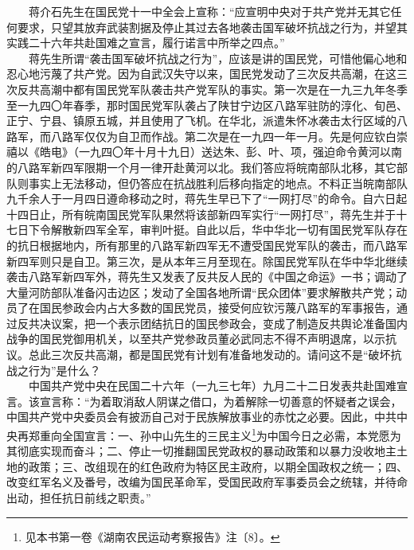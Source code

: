 \documentclass[cn,11pt,chinese]{elegantbook}
\begin{document}
　　蒋介石先生在国民党十一中全会上宣称：“应宣明中央对于共产党并无其它任何要求，只望其放弃武装割据及停止其过去各地袭击国军破坏抗战之行为，并望其实践二十六年共赴国难之宣言，履行诺言中所举之四点。”\\
　　蒋先生所谓“袭击国军破坏抗战之行为”，应该是讲的国民党，可惜他偏心地和忍心地污蔑了共产党。因为自武汉失守以来，国民党发动了三次反共高潮，在这三次反共高潮中都有国民党军队袭击共产党军队的事实。第一次是在一九三九年冬季至一九四〇年春季，那时国民党军队袭占了陕甘宁边区八路军驻防的淳化、旬邑、正宁、宁县、镇原五城，并且使用了飞机。在华北，派遣朱怀冰袭击太行区域的八路军，而八路军仅仅为自卫而作战。第二次是在一九四一年一月。先是何应钦白崇禧以《皓电》（一九四〇年十月十九日）送达朱、彭、叶、项，强迫命令黄河以南的八路军新四军限期一个月一律开赴黄河以北。我们答应将皖南部队北移，其它部队则事实上无法移动，但仍答应在抗战胜利后移向指定的地点。不料正当皖南部队九千余人于一月四日遵命移动之时，蒋先生早已下了“一网打尽”的命令。自六日起十四日止，所有皖南国民党军队果然将该部新四军实行“一网打尽”，蒋先生并于十七日下令解散新四军全军，审判叶挺。自此以后，华中华北一切有国民党军队存在的抗日根据地内，所有那里的八路军新四军无不遭受国民党军队的袭击，而八路军新四军则只是自卫。第三次，是从本年三月至现在。除国民党军队在华中华北继续袭击八路军新四军外，蒋先生又发表了反共反人民的《中国之命运》一书；调动了大量河防部队准备闪击边区；发动了全国各地所谓“民众团体”要求解散共产党；动员了在国民参政会内占大多数的国民党员，接受何应钦污蔑八路军的军事报告，通过反共决议案，把一个表示团结抗日的国民参政会，变成了制造反共舆论准备国内战争的国民党御用机关，以至共产党参政员董必武同志不得不声明退席，以示抗议。总此三次反共高潮，都是国民党有计划有准备地发动的。请问这不是“破坏抗战之行为”是什么？\\
　　中国共产党中央在民国二十六年（一九三七年）九月二十二日发表共赴国难宣言。该宣言称：“为着取消敌人阴谋之借口，为着解除一切善意的怀疑者之误会，中国共产党中央委员会有披沥自己对于民族解放事业的赤忱之必要。因此，中共中央再郑重向全国宣言：一、孙中山先生的三民主义\footnote[7]{ 见本书第一卷《湖南农民运动考察报告》注〔8〕。}为中国今日之必需，本党愿为其彻底实现而奋斗；二、停止一切推翻国民党政权的暴动政策和以暴力没收地主土地的政策；三、改组现在的红色政府为特区民主政府，以期全国政权之统一；四、改变红军名义及番号，改编为国民革命军，受国民政府军事委员会之统辖，并待命出动，担任抗日前线之职责。”\\
\end{document}
